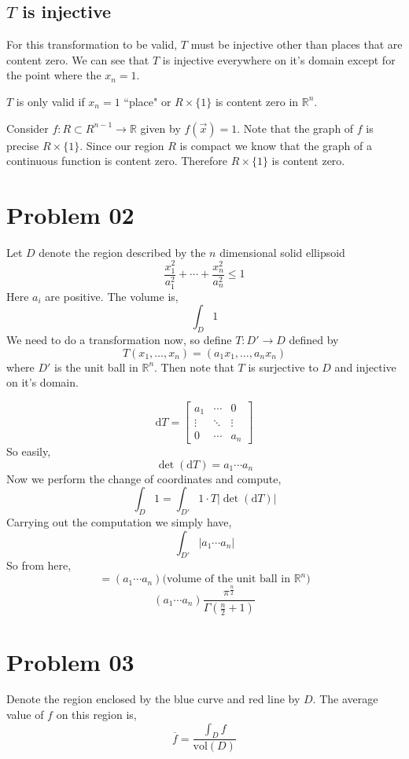 \documentclass[letter]{article}
\begin{document}
\subsection*{$T$ is injective}
For this transformation to be valid, $T$ must be injective other than places that are content zero. We can see that $T$ is injective everywhere on it's domain except for the point where the $x_n = 1$. 

$T$ is only valid if $x_n = 1$ ``place" or $R \times \{1\} $ is content zero in $\mathbb{R}^{n}$. 

Consider $f: R \subset R^{n-1} \to \mathbb{R}$ given by $f(\vec{x}) = 1$. Note that the graph of $f$ is precise $R \times \{1\} $. Since our region $R$ is compact we know that the graph of a continuous function is content zero. Therefore $R \times \{1\} $ is content zero. 


\section*{Problem 02} 
Let $D$ denote the region described by the $n$ dimensional solid ellipsoid
\[
\frac{x_1^2}{a_1^2} + \cdots + \frac{x_n^2}{a_n^2} \le 1
\] 
Here $a_i$ are positive. The volume is, 
\[
\int_D 1
\] 
We need to do a transformation now, so define $T : D' \to  D$ defined by
\[
T(x_1, \ldots, x_n) = (a_1 x_1 ,\ldots, a_n x_n)
\] 
where $D'$ is the unit ball in $\mathbb{R}^{n}$. Then note that $T$ is surjective to $D$ and injective on it's domain. 

\[
\text{d}T = 
\begin{bmatrix} a_1 & \cdots & 0 \\ 
\vdots & \ddots & \vdots \\ 
0 & \cdots & a_n \end{bmatrix} 
\]
So easily,
\[
\det (\mathrm{d} T) = a_1 \cdots a_n 
\]
Now we perform the change of coordinates and compute, 
\[
	\int_D 1 = \int_{D'} 1 \cdot T | \det (\mathrm{d} T) | 
\]
Carrying out the computation we simply have, 
\[
	\int_{D'} |a_1 \cdots a_n| 
\]
So from here, 
\[
= (a_1 \cdots a_n) \text{(volume of the unit ball in }\mathbb{R}^{n})
\]
\[
\boxed{
	(a_1 \cdots a_n) \frac{\pi^{\frac{n}{2}}}{\Gamma \left(\frac{n}{2} + 1\right)}
}
\] 

\section*{Problem 03} 
Denote the region enclosed by the blue curve and red line by $D$. The average value of $f$ on this region is, 
\[
\overline{f} = 
\frac{\int_D f}{ \text{vol} (D)}
\] 
\end{document}
